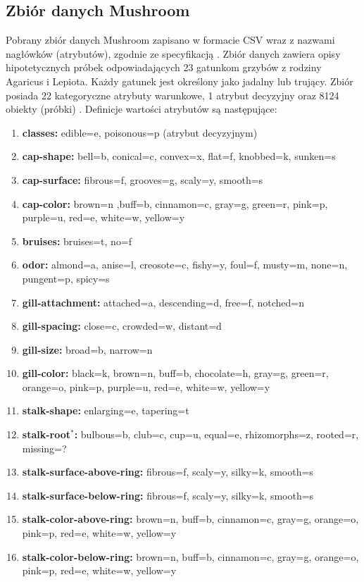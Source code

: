 \documentclass[10pt,a4paper]{article}
\begin{document}
\subsection{Zbiór danych Mushroom}
Pobrany zbiór danych Mushroom zapisano w formacie CSV wraz z nazwami nagłówków (atrybutów), zgodnie ze specyfikacją . Zbiór danych zawiera opisy hipotetycznych próbek odpowiadających 23 gatunkom grzybów z rodziny Agaricus i Lepiota. Każdy gatunek jest określony jako jadalny lub trujący. Zbiór posiada 22 kategoryczne atrybuty warunkowe, 1 atrybut decyzyjny oraz 8124 obiekty (próbki) \cite{MushroomDS}. Definicje wartości atrybutów są następujące:
\begin{enumerate}
	\item \textbf{classes:} edible=e, poisonous=p (atrybut decyzyjnym)
	\item \textbf{cap-shape:} bell=b, conical=c, convex=x, flat=f, knobbed=k, sunken=s
	\item \textbf{cap-surface:} fibrous=f, grooves=g, scaly=y, smooth=s
	\item \textbf{cap-color:} brown=n ,buff=b, cinnamon=c, gray=g, green=r, pink=p, purple=u, red=e, white=w, yellow=y
	\item \textbf{bruises:} bruises=t, no=f
	\item \textbf{odor:} almond=a, anise=l, creosote=c, fishy=y, foul=f, musty=m, none=n, pungent=p, spicy=s
	\item \textbf{gill-attachment:} attached=a, descending=d, free=f, notched=n
	\item \textbf{gill-spacing:} close=c, crowded=w, distant=d
	\item \textbf{gill-size:} broad=b, narrow=n
	\item \textbf{gill-color:} black=k, brown=n, buff=b, chocolate=h, gray=g, green=r, orange=o, pink=p, purple=u, red=e, white=w, yellow=y
	\item \textbf{stalk-shape:} enlarging=e, tapering=t
	\item \textbf{stalk-root$^*$:} bulbous=b, club=c, cup=u, equal=e, rhizomorphs=z, rooted=r, missing=?
	\item \textbf{stalk-surface-above-ring:} fibrous=f, scaly=y, silky=k, smooth=s
	\item \textbf{stalk-surface-below-ring:} fibrous=f, scaly=y, silky=k, smooth=s
	\item \textbf{stalk-color-above-ring:} brown=n, buff=b, cinnamon=c, gray=g, orange=o, pink=p, red=e, white=w, yellow=y
	\item \textbf{stalk-color-below-ring:} brown=n, buff=b, cinnamon=c, gray=g, orange=o, pink=p, red=e, white=w, yellow=y

\end{enumerate}
\end{document}
